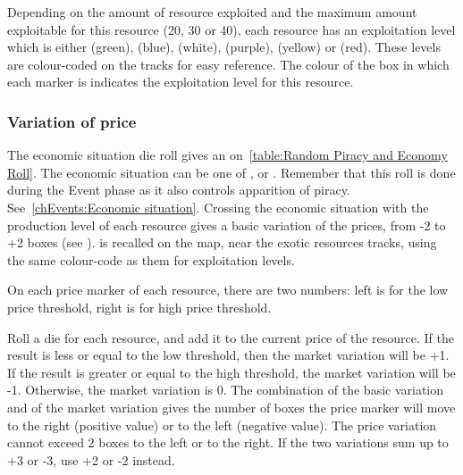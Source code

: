 \aparag Depending on the amount of resource exploited and the maximum amount
exploitable for this resource (20, 30 or 40), each resource has an
exploitation level which is either  (green),  (blue),
 (white),  (purple),  (yellow) or
 (red).
\bparag These levels are colour-coded on the tracks for easy reference.
\bparag The colour of the box in which each  marker
is indicates the exploitation level for this resource.


\subsubsection{Variation of price}
\label{chExpenses:Variation}

\bparag The economic situation die roll gives an 
on~\ref{table:Random Piracy and Economy Roll}. The economic situation can be
one of ,  or .
\bparag Remember that this roll is done during the Event phase as it also
controls apparition of piracy. See~\ref{chEvents:Economic situation}.
\bparag Crossing the economic situation with the production level of each
resource gives a basic variation of the prices, from -2 to +2 boxes (see
).
\bparag {} is recalled on the \ROTW
map, near the exotic resources tracks, using the same colour-code as them for
exploitation levels.


\aparag On each price marker of each resource, there are two numbers: left is
for the low price threshold, right is for high price threshold.

 Roll a die for each resource, and add it to the
current price of the resource. If the result is less or equal to the low
threshold, then the market variation will be +1. If the result is greater or
equal to the high threshold, the market variation will be -1. Otherwise, the
market variation is 0.
\bparag The combination of the basic variation and of the market variation
gives the number of boxes the price marker will move to the right (positive
value) or to the left (negative value).
\bparag The price variation cannot exceed 2 boxes to the left or to the
right. If the two variations sum up to +3 or -3, use +2 or -2 instead.


